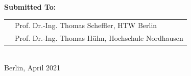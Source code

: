 \begin{titlepage}
\begin{center}
    \vspace{2cm}

    \large \textbf{Submitted To:}

    \vspace{.2cm}

		\begin{tabular}{rl}
			& Prof. Dr.-Ing. Thomas Scheffler, HTW Berlin\\
			& Prof. Dr.-Ing. Thomas Hühn, Hochschule Nordhausen\\
		\end{tabular}\\

    \vspace{2cm}
    \vspace{0.5cm}
    \large Berlin, April 2021\\

  \end{center}
\end{titlepage}
